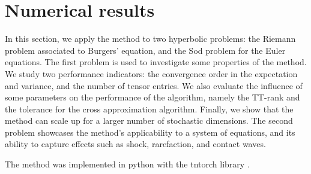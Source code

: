 \documentclass{article}
\begin{document}
\section{Numerical results} \label{sec:Numerics}
In this section, we apply the method to two hyperbolic problems:
the Riemann problem associated to Burgers' equation, and the Sod problem for the Euler equations. 
The first problem is used to investigate some properties of the method. 
We study two performance indicators: the convergence order in the expectation and variance, and the number of tensor entries. 
We also evaluate the influence of some parameters on the performance of the algorithm, namely the TT-rank and the tolerance for the cross approximation algorithm. 
Finally, we show that the method can scale up for a larger number of stochastic dimensions. 
The second problem showcases the method's applicability to a system of equations, and its ability to capture effects such as shock, rarefaction, and contact waves. 

The method was implemented in python with the tntorch library \cite{usvyatsov_tntorch_2022}. 
\end{document}
